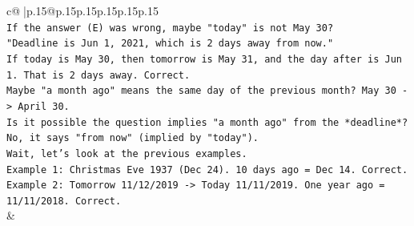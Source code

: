 \documentclass{article}
\begin{document}
{\begin{supertabular}{c@{$\;$}|p{.15\linewidth}@{}p{.15\linewidth}p{.15\linewidth}p{.15\linewidth}p{.15\linewidth}p{.15\linewidth}}
{{{\\ 
\texttt{If the answer (E) was wrong, maybe "today" is not May 30?} \\
\texttt{"Deadline is Jun 1, 2021, which is 2 days away from now."} \\
\texttt{If today is May 30, then tomorrow is May 31, and the day after is Jun 1. That is 2 days away. Correct.} \\
\texttt{Maybe "a month ago" means the same day of the previous month? May 30 {-}> April 30.} \\
\texttt{Is it possible the question implies "a month ago" from the *deadline*? No, it says "from now" (implied by "today").} \\
\texttt{Wait, let's look at the previous examples.} \\
\texttt{Example 1: Christmas Eve 1937 (Dec 24). 10 days ago = Dec 14. Correct.} \\
\texttt{Example 2: Tomorrow 11/12/2019 {-}> Today 11/11/2019. One year ago = 11/11/2018. Correct.} \\
            }
        }
    }
    & \\ \\

\end{supertabular}
}
\end{document}
